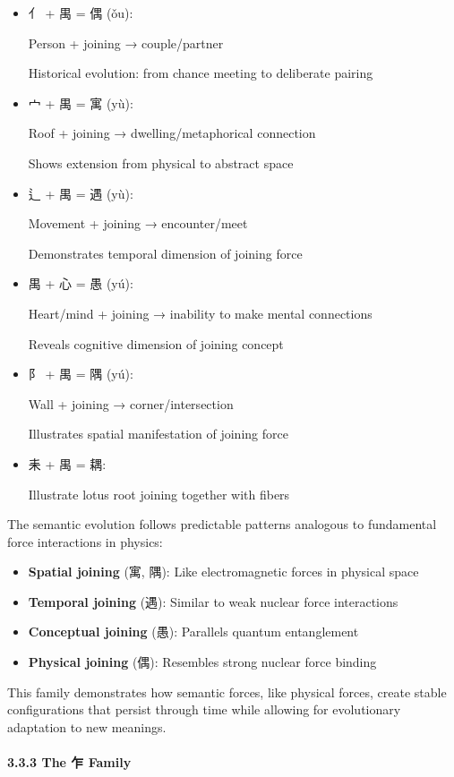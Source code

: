 \documentclass[
  11pt,
  letterpaper,
]{article}
\providecommand{\tightlist}{%
  \setlength{\itemsep}{0pt}\setlength{\parskip}{0pt}}
\begin{document}
\begin{itemize}
\item
  亻 + 禺 = 偶 (ǒu):

  Person + joining → couple/partner

  Historical evolution: from chance meeting to deliberate pairing
\item
  宀 + 禺 = 寓 (yù):

  Roof + joining → dwelling/metaphorical connection

  Shows extension from physical to abstract space
\item
  辶 + 禺 = 遇 (yù):

  Movement + joining → encounter/meet

  Demonstrates temporal dimension of joining force
\item
  禺 + 心 = 愚 (yú):

  Heart/mind + joining → inability to make mental connections

  Reveals cognitive dimension of joining concept
\item
  阝 + 禺 = 隅 (yú):

  Wall + joining → corner/intersection

  Illustrates spatial manifestation of joining force
\item
  耒 + 禺 = 耦:

  Illustrate lotus root joining together with fibers
\end{itemize}

The semantic evolution follows predictable patterns analogous to
fundamental force interactions in physics:

\begin{itemize}
\tightlist
\item
  \textbf{Spatial joining} (寓, 隅): Like electromagnetic forces in
  physical space
\item
  \textbf{Temporal joining} (遇): Similar to weak nuclear force
  interactions
\item
  \textbf{Conceptual joining} (愚): Parallels quantum entanglement
\item
  \textbf{Physical joining} (偶): Resembles strong nuclear force binding
\end{itemize}

This family demonstrates how semantic forces, like physical forces,
create stable configurations that persist through time while allowing
for evolutionary adaptation to new meanings.

\hypertarget{the-ux4e4d-family}{%
\paragraph{3.3.3 The 乍 Family}\label{the-ux4e4d-family}}
\end{document}
